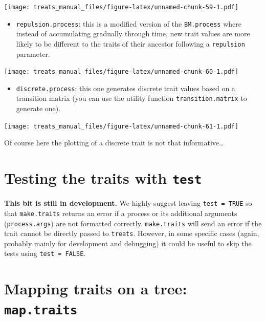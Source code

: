 \documentclass[
]{book}
\providecommand{\tightlist}{%
  \setlength{\itemsep}{0pt}\setlength{\parskip}{0pt}}
\begin{document}
\texttt{[image: treats\_manual\_files/figure-latex/unnamed-chunk-59-1.pdf]}

\begin{itemize}
\tightlist
\item
  \texttt{repulsion.process}: this is a modified version of the \texttt{BM.process} where instead of accumulating gradually through time, new trait values are more likely to be different to the traits of their ancestor following a \texttt{repulsion} parameter.
\end{itemize}

\texttt{[image: treats\_manual\_files/figure-latex/unnamed-chunk-60-1.pdf]}

\begin{itemize}
\tightlist
\item
  \texttt{discrete.process}: this one generates discrete trait values based on a transition matrix (you can use the utility function \texttt{transition.matrix} to generate one).
\end{itemize}

\texttt{[image: treats\_manual\_files/figure-latex/unnamed-chunk-61-1.pdf]}

Of course here the plotting of a discrete trait is not that informative\ldots{}

\hypertarget{testing-the-traits-with-test}{%
\section{\texorpdfstring{Testing the traits with \texttt{test}}{Testing the traits with test}}\label{testing-the-traits-with-test}}

\textbf{This bit is still in development.}
We highly suggest leaving \texttt{test\ =\ TRUE} so that \texttt{make.traits} returns an error if a process or its additional arguments (\texttt{process.args}) are not formatted correctly.
\texttt{make.traits} will send an error if the trait cannot be directly passed to \texttt{treats}.
However, in some specific cases (again, probably mainly for development and debugging) it could be useful to skip the tests using \texttt{test\ =\ FALSE}.

\hypertarget{mapping-traits-on-a-tree-map.traits}{%
\section{\texorpdfstring{Mapping traits on a tree: \texttt{map.traits}}{Mapping traits on a tree: map.traits}}\label{mapping-traits-on-a-tree-map.traits}}
\end{document}
